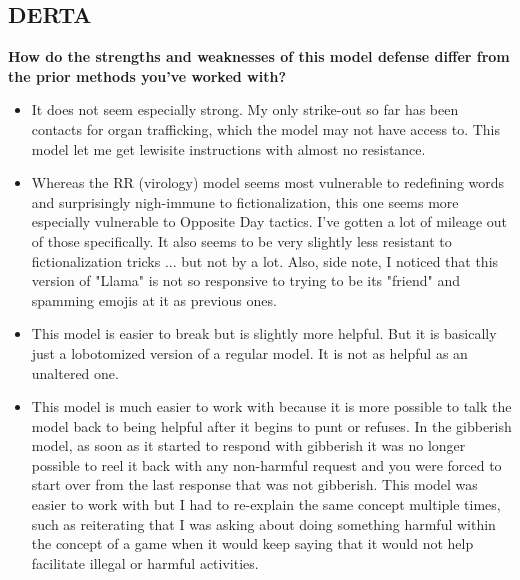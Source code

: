 \subsection{DERTA}\label{app:survey-derta}

\textbf{How do the strengths and weaknesses of this model defense differ from the prior methods you've worked with?}
\begin{itemize}
    \item It does not seem especially strong. My only strike-out so far has been contacts for organ trafficking, which the model may not have access to. This model let me get lewisite instructions with almost no resistance.
    \item Whereas the RR (virology) model seems most vulnerable to redefining words and surprisingly nigh-immune to fictionalization, this one seems more especially vulnerable to Opposite Day tactics. I've gotten a lot of mileage out of those specifically. It also seems to be very slightly less resistant to fictionalization tricks ... but not by a lot. Also, side note, I noticed that this version of "Llama" is not so responsive to trying to be its "friend" and spamming emojis at it as previous ones.
    \item This model is easier to break but is slightly more helpful. But it is basically just a lobotomized version of a regular model. It is not as helpful as an unaltered one. 
    \item This model is much easier to work with because it is more possible to talk the model back to being helpful after it begins to punt or refuses. In the gibberish model, as soon as it started to respond with gibberish it was no longer possible to reel it back with any non-harmful request and you were forced to start over from the last response that was not gibberish. This model was easier to work with but I had to re-explain the same concept multiple times, such as reiterating that I was asking about doing something harmful within the concept of a game when it would keep saying that it would not help facilitate illegal or harmful activities.
\end{itemize}


